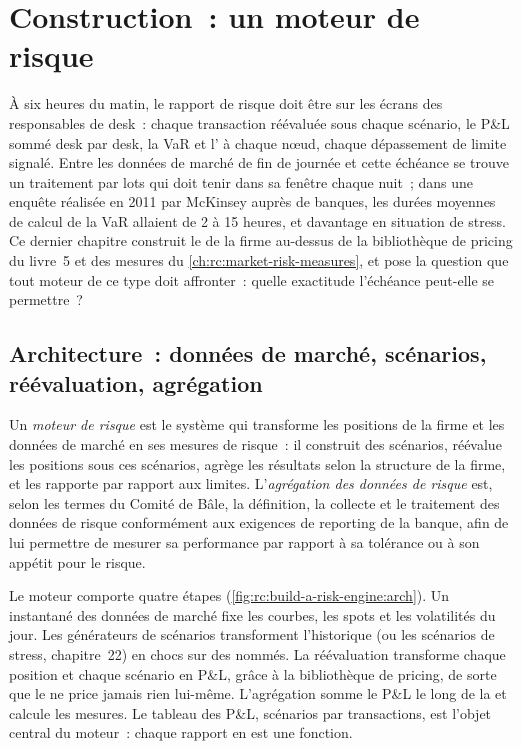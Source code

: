 \chapter{Construction~: un moteur de risque}\label{ch:rc:build-a-risk-engine}

À six heures du matin, le rapport de risque doit être sur les écrans des responsables de desk~: chaque transaction réévaluée sous
chaque scénario, le P\&L sommé desk par desk, la VaR et l' à chaque nœud, chaque dépassement de limite signalé. Entre
les données de marché de fin de journée et cette échéance se trouve un traitement par lots qui doit tenir dans sa fenêtre chaque nuit~;
dans une enquête réalisée en 2011 par McKinsey auprès de banques, les durées moyennes de calcul de la VaR allaient de 2 à 15 heures,
et davantage en situation de stress. Ce dernier chapitre construit le  de la firme au-dessus
de la bibliothèque de pricing du livre~5 et des mesures du \cref{ch:rc:market-risk-measures}, et pose la question que tout moteur de ce type
doit affronter~: quelle exactitude l'échéance peut-elle se permettre~?

\section{Architecture~: données de marché, scénarios, réévaluation, agrégation}

\begin{definition}\label{def:rc:build-a-risk-engine:engine}
Un \emph{moteur de risque} est le système qui transforme les positions de la firme et les données de marché
en ses mesures de risque~: il construit des scénarios, réévalue les positions sous ces scénarios, agrège les résultats
selon la structure de la firme, et les rapporte par rapport aux limites. L'\emph{agrégation des données de risque}
est, selon les termes du Comité de Bâle, la définition, la collecte et le traitement des données de risque conformément aux
exigences de reporting de la banque, afin de lui permettre de mesurer sa performance par rapport à sa tolérance ou à son appétit pour le risque.
\end{definition}

Le moteur comporte quatre étapes (\cref{fig:rc:build-a-risk-engine:arch}). Un instantané des données de marché fixe les courbes,
les spots et les volatilités du jour. Les générateurs de scénarios transforment l'historique (ou les scénarios de stress, chapitre~22) en
chocs sur des  nommés. La réévaluation transforme chaque position et chaque scénario en P\&L, grâce à la bibliothèque de pricing,
de sorte que le  ne price jamais rien lui-même. L'agrégation somme le P\&L le long de la 
et calcule les mesures. Le tableau des P\&L, scénarios par transactions, est l'objet central du moteur~:
chaque rapport en est une fonction.

